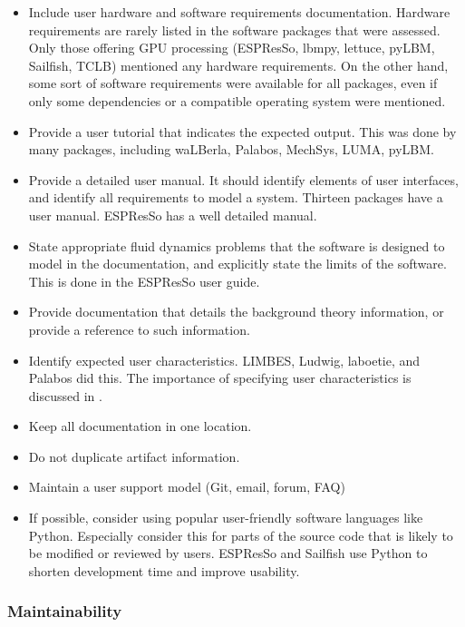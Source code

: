 \documentclass[12pt, notitlepage]{article}
\begin{document}
\begin{itemize}
	\item Include user hardware and software requirements documentation. Hardware requirements are rarely listed in the software packages that were assessed. Only those offering GPU processing (ESPResSo, lbmpy, lettuce, pyLBM, Sailfish, TCLB) mentioned any hardware requirements. On the other hand, some sort of software requirements were available for all packages, even if only some dependencies or a compatible operating system were mentioned.
	\item Provide a user tutorial that indicates the expected output. This was done by many packages, including waLBerla, Palabos, MechSys, LUMA, pyLBM.
	\item Provide a detailed user manual. It should identify elements of user interfaces, and identify all requirements to model a system. Thirteen packages have a user manual. ESPResSo has a well detailed manual.
	\item State appropriate fluid dynamics problems that the software is designed to model in the documentation, and explicitly state the limits of the software. This is done in the ESPResSo user guide.
	\item Provide documentation that details the background theory information, or provide a reference to such information.
	\item Identify expected user characteristics. LIMBES, Ludwig, laboetie, and Palabos did this. The importance of specifying user characteristics is discussed in \citep{smith2007requirements}.
	\item Keep all documentation in one location.
	\item Do not duplicate artifact information.
	\item Maintain a user support model (Git, email, forum, FAQ)
	\item If possible, consider using popular user-friendly software languages like Python. Especially consider this for parts of the source code that is likely to be modified or reviewed by users. ESPResSo and Sailfish use Python to shorten development time and improve usability.
\end{itemize}

\subsubsection{Maintainability}
\end{document}
